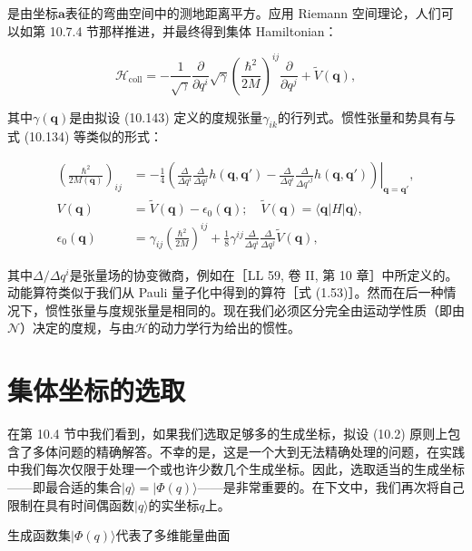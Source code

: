 是由坐标$\boldsymbol{a}$表征的弯曲空间中的测地距离平方。应用 Riemann 空间理论，人们可以如第 10.7.4
节那样推进，并最终得到集体 Hamiltonian：

\begin{equation}
\mathscr{H}_{\mathrm{coll}}=-\frac{1}{\sqrt{\gamma}}\frac{\partial}{\partial q^{i}}\sqrt{\gamma}\left(\frac{\hbar^{2}}{2M}\right)^{ij}\frac{\partial}{\partial q^{j}}+\tilde{V}(\boldsymbol{q}),\label{eq:10.144}
\end{equation}

其中$\gamma(\boldsymbol{q})$是由拟设 (10.143) 定义的度规张量$\gamma_{ik}$的行列式。惯性张量和势具有与式
(10.134) 等类似的形式：

\begin{align}
\left(\frac{\hbar^{2}}{2M(\boldsymbol{q})}\right)_{ij} & =\left.-\frac{1}{4}\left(\frac{\Delta}{\Delta q^{i}}\frac{\Delta}{\Delta q^{j}}h(\boldsymbol{q},\boldsymbol{q}')-\frac{\Delta}{\Delta q^{i}}\frac{\Delta}{\Delta q'^{j}}h(\boldsymbol{q},\boldsymbol{q}')\right)\right|_{\boldsymbol{q}=\boldsymbol{q}'},\nonumber \\
V(\boldsymbol{q}) & =\tilde{V}(\boldsymbol{q})-\epsilon_{0}(\boldsymbol{q});\quad\tilde{V}(\boldsymbol{q})=\langle\boldsymbol{q}|H|\boldsymbol{q}\rangle,\nonumber \\
\epsilon_{0}(\boldsymbol{q}) & =\gamma_{ij}\left(\frac{\hbar^{2}}{2M}\right)^{ij}+\frac{1}{8}\gamma^{ij}\frac{\Delta}{\Delta q^{i}}\frac{\Delta}{\Delta q^{j}}\tilde{V}(\boldsymbol{q}),\label{eq:10.145}
\end{align}

其中$\Delta/\Delta q^{i}$是张量场的协变微商，例如在［LL 59, 卷 II, 第 10 章］中所定义的。动能算符类似于我们从
Pauli 量子化中得到的算符［式 (1.53)］。然而在后一种情况下，惯性张量与度规张量是相同的。现在我们必须区分完全由运动学性质（即由$\mathscr{N}$）决定的度规，与由$\mathscr{H}$的动力学行为给出的惯性。

\section{集体坐标的选取}

在第 10.4 节中我们看到，如果我们选取足够多的生成坐标，拟设 (10.2) 原则上包含了多体问题的精确解答。不幸的是，这是一个大到无法精确处理的问题，在实践中我们每次仅限于处理一个或也许少数几个生成坐标。因此，选取适当的生成坐标——即最合适的集合$|q\rangle=|\Phi(q)\rangle$——是非常重要的。在下文中，我们再次将自己限制在具有时间偶函数$|q\rangle$的实坐标$q$上。

生成函数集$|\Phi(q)\rangle$代表了多维能量曲面

